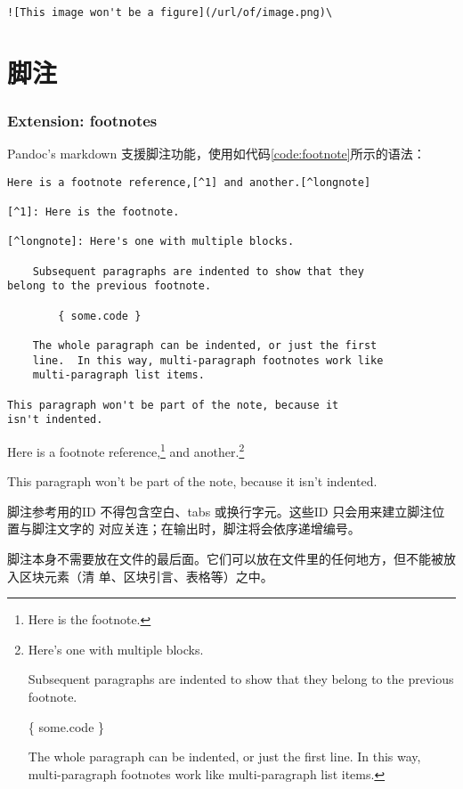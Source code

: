 \documentclass[fancyhdr,bookmark]{ctexbook}
\begin{document}
\begin{lstlisting}
![This image won't be a figure](/url/of/image.png)\
\end{lstlisting}

\section{脚注}\label{ux811aux6ce8}

\subsubsection{Extension: footnotes}\label{extension-footnotes}

Pandoc's markdown
支援脚注功能，使用如代码\ref{code:footnote}所示的语法：

\begin{lstlisting}[caption=脚注语法, label=code:footnote, float=htbp]
Here is a footnote reference,[^1] and another.[^longnote]

[^1]: Here is the footnote.

[^longnote]: Here's one with multiple blocks.

    Subsequent paragraphs are indented to show that they
belong to the previous footnote.

        { some.code }

    The whole paragraph can be indented, or just the first
    line.  In this way, multi-paragraph footnotes work like
    multi-paragraph list items.

This paragraph won't be part of the note, because it
isn't indented.
\end{lstlisting}

Here is a footnote reference,\footnote{Here is the footnote.} and
another.\footnote{Here's one with multiple blocks.

  Subsequent paragraphs are indented to show that they belong to the
  previous footnote.

  \{ some.code \}

  The whole paragraph can be indented, or just the first line. In this
  way, multi-paragraph footnotes work like multi-paragraph list items.}

This paragraph won't be part of the note, because it isn't indented.

脚注参考用的ID 不得包含空白、tabs 或换行字元。这些ID
只会用来建立脚注位置与脚注文字的
对应关连；在输出时，脚注将会依序递增编号。

脚注本身不需要放在文件的最后面。它们可以放在文件里的任何地方，但不能被放入区块元素（清
单、区块引言、表格等）之中。
\end{document}
